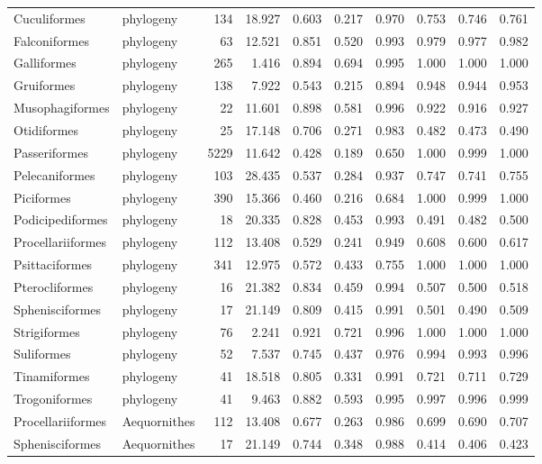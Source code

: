 \begin{table}[ht]
\begin{tabular}{llrrrrrrrr}
  Cuculiformes & phylogeny &  134 & 18.927 & 0.603 & 0.217 & 0.970 & 0.753 & 0.746 & 0.761 \\ 
  Falconiformes & phylogeny &   63 & 12.521 & 0.851 & 0.520 & 0.993 & 0.979 & 0.977 & 0.982 \\ 
  Galliformes & phylogeny &  265 & 1.416 & 0.894 & 0.694 & 0.995 & 1.000 & 1.000 & 1.000 \\ 
  Gruiformes & phylogeny &  138 & 7.922 & 0.543 & 0.215 & 0.894 & 0.948 & 0.944 & 0.953 \\ 
  Musophagiformes & phylogeny &   22 & 11.601 & 0.898 & 0.581 & 0.996 & 0.922 & 0.916 & 0.927 \\ 
  Otidiformes & phylogeny &   25 & 17.148 & 0.706 & 0.271 & 0.983 & 0.482 & 0.473 & 0.490 \\ 
  Passeriformes & phylogeny & 5229 & 11.642 & 0.428 & 0.189 & 0.650 & 1.000 & 0.999 & 1.000 \\ 
  Pelecaniformes & phylogeny &  103 & 28.435 & 0.537 & 0.284 & 0.937 & 0.747 & 0.741 & 0.755 \\ 
  Piciformes & phylogeny &  390 & 15.366 & 0.460 & 0.216 & 0.684 & 1.000 & 0.999 & 1.000 \\ 
  Podicipediformes & phylogeny &   18 & 20.335 & 0.828 & 0.453 & 0.993 & 0.491 & 0.482 & 0.500 \\ 
  Procellariiformes & phylogeny &  112 & 13.408 & 0.529 & 0.241 & 0.949 & 0.608 & 0.600 & 0.617 \\ 
  Psittaciformes & phylogeny &  341 & 12.975 & 0.572 & 0.433 & 0.755 & 1.000 & 1.000 & 1.000 \\ 
  Pterocliformes & phylogeny &   16 & 21.382 & 0.834 & 0.459 & 0.994 & 0.507 & 0.500 & 0.518 \\ 
  Sphenisciformes & phylogeny &   17 & 21.149 & 0.809 & 0.415 & 0.991 & 0.501 & 0.490 & 0.509 \\ 
  Strigiformes & phylogeny &   76 & 2.241 & 0.921 & 0.721 & 0.996 & 1.000 & 1.000 & 1.000 \\ 
  Suliformes & phylogeny &   52 & 7.537 & 0.745 & 0.437 & 0.976 & 0.994 & 0.993 & 0.996 \\ 
  Tinamiformes & phylogeny &   41 & 18.518 & 0.805 & 0.331 & 0.991 & 0.721 & 0.711 & 0.729 \\ 
  Trogoniformes & phylogeny &   41 & 9.463 & 0.882 & 0.593 & 0.995 & 0.997 & 0.996 & 0.999 \\ 
  Procellariiformes & Aequornithes &  112 & 13.408 & 0.677 & 0.263 & 0.986 & 0.699 & 0.690 & 0.707 \\ 
  Sphenisciformes & Aequornithes &   17 & 21.149 & 0.744 & 0.348 & 0.988 & 0.414 & 0.406 & 0.423 \\ 

\end{tabular}
\end{table}
